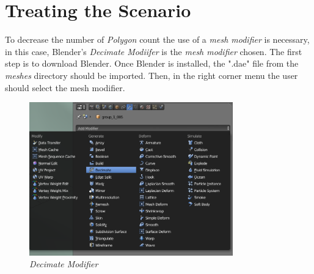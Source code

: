 		\section{Treating the Scenario}
		
		To decrease the number of \textit{Polygon} count the use of a \textit{mesh modifier} is necessary, in this case, Blender's \textit{Decimate Modiifer} is the \textit{mesh modifier} chosen. The first step is to download Blender.
		Once Blender is installed, the ".dae" file from the \textit{meshes} directory should be imported. Then, in the right corner menu the user should select the mesh modifier.
			
			\begin{figure}[!ht]
			\centering
			\includegraphics[width=250pt]{figuras/decimod.png}
			\caption{\textit{Decimate Modifier}}
			\label{decimod}
			\end{figure}
		
